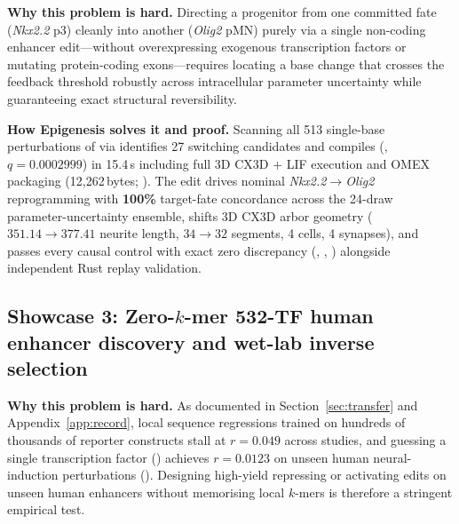 \documentclass[10.5pt,a4paper]{article}
\begin{document}
\textbf{Why this problem is hard.} Directing a progenitor from one committed fate (\emph{Nkx2.2} p3) cleanly into another (\emph{Olig2} pMN) purely via a single non-coding enhancer edit—without overexpressing exogenous transcription factors or mutating protein-coding exons—requires locating a base change that crosses the feedback threshold robustly across intracellular parameter uncertainty while guaranteeing exact structural reversibility.

\textbf{How Epigenesis solves it and proof.} Scanning all 513 single-base perturbations of  via  identifies 27 switching candidates and compiles \textbf{} (, $q=0.0002999$) in 15.4\,s including full 3D CX3D + LIF execution and OMEX packaging (12,262\,bytes;  ). The edit drives nominal \emph{Nkx2.2}$\rightarrow$\emph{Olig2} reprogramming with \textbf{100\%} target-fate concordance across the 24-draw parameter-uncertainty ensemble, shifts 3D CX3D arbor geometry ($351.14\rightarrow 377.41$ neurite length, $34\rightarrow 32$ segments, 4 cells, 4 synapses), and passes every causal control with exact zero discrepancy (, , ) alongside independent Rust replay validation.

\subsection{Showcase 3: Zero-$k$-mer 532-TF human enhancer discovery and wet-lab inverse selection}

\textbf{Why this problem is hard.} As documented in Section~\ref{sec:transfer} and Appendix~\ref{app:record}, local sequence regressions trained on hundreds of thousands of reporter constructs stall at $r=0.049$ across studies, and guessing a single transcription factor () achieves $r=0.0123$ on unseen human neural-induction perturbations (). Designing high-yield repressing or activating edits on unseen human enhancers without memorising local $k$-mers is therefore a stringent empirical test.
\end{document}

